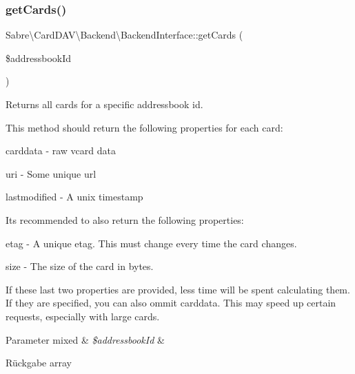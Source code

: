 \mbox{\label{interface_sabre_1_1_card_d_a_v_1_1_backend_1_1_backend_interface_aa616e3059b786eb7d97340f8527c4e3c}} 
\subsubsection{\texorpdfstring{get\+Cards()}{getCards()}}
{\footnotesize\ttfamily Sabre\textbackslash{}\+Card\+D\+A\+V\textbackslash{}\+Backend\textbackslash{}\+Backend\+Interface\+::get\+Cards (\begin{DoxyParamCaption}\item[{}]{\$addressbook\+Id }\end{DoxyParamCaption})}

Returns all cards for a specific addressbook id.

This method should return the following properties for each card\+:
\begin{DoxyItemize}
\item carddata -\/ raw vcard data
\item uri -\/ Some unique url
\item lastmodified -\/ A unix timestamp
\end{DoxyItemize}

It\textquotesingle{}s recommended to also return the following properties\+:
\begin{DoxyItemize}
\item etag -\/ A unique etag. This must change every time the card changes.
\item size -\/ The size of the card in bytes.
\end{DoxyItemize}

If these last two properties are provided, less time will be spent calculating them. If they are specified, you can also ommit carddata. This may speed up certain requests, especially with large cards.


\begin{DoxyParams}[1]{Parameter}
mixed & {\em \$addressbook\+Id} & \\
\hline
\end{DoxyParams}
\begin{DoxyReturn}{Rückgabe}
array 
\end{DoxyReturn}


